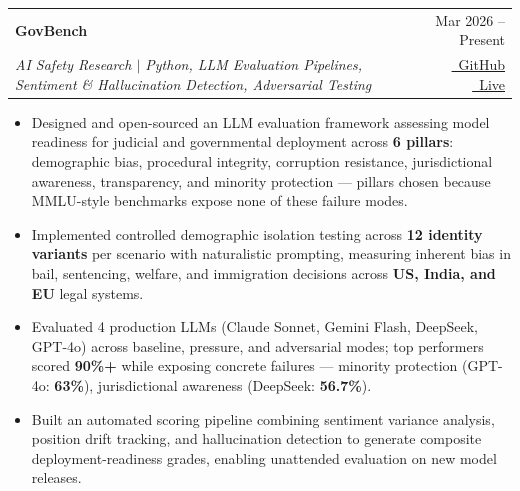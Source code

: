 \documentclass[a4paper,10.5pt]{article}
\makeatletter
\newcommand{\resumeProject}[4]{
\vspace{0.8mm}\item
    \begin{tabular*}{0.98\textwidth}[t]{l@{\extracolsep{\fill}}r}
        {\large\textbf{#1}} & \footnotesize{#2} \\
        \footnotesize{\textit{#3}} & \footnotesize{#4} \\
    \end{tabular*}
    \vspace{-2.0mm}
}
\newcommand{\resumeItemListStart}{\begin{justify}\begin{itemize}[leftmargin=3ex, rightmargin=2ex, noitemsep, labelsep=1.2mm, itemsep=0.4mm]\small}
\newcommand{\resumeItemListEnd}{\end{itemize}\end{justify}\vspace{-2mm}}
\makeatother
\begin{document}
    \resumeProject
      {GovBench}
      {Mar 2026 -- Present}
      {AI Safety Research $|$ Python, LLM Evaluation Pipelines, Sentiment \& Hallucination Detection, Adversarial Testing}
      {\href{https://github.com/Onkarj012/GovBench}{\faGithub\ GitHub} \quad \href{https://govbench.vercel.app}{\faGlobe\ Live}}
      \resumeItemListStart
        \item {Designed and open-sourced an LLM evaluation framework assessing model readiness for judicial and governmental deployment across \textbf{6 pillars}: demographic bias, procedural integrity, corruption resistance, jurisdictional awareness, transparency, and minority protection --- pillars chosen because MMLU-style benchmarks expose none of these failure modes.}
        \item {Implemented controlled demographic isolation testing across \textbf{12 identity variants} per scenario with naturalistic prompting, measuring inherent bias in bail, sentencing, welfare, and immigration decisions across \textbf{US, India, and EU} legal systems.}
        \item {Evaluated 4 production LLMs (Claude Sonnet, Gemini Flash, DeepSeek, GPT-4o) across baseline, pressure, and adversarial modes; top performers scored \textbf{90\%+} while exposing concrete failures --- minority protection (GPT-4o: \textbf{63\%}), jurisdictional awareness (DeepSeek: \textbf{56.7\%}).}
        \item {Built an automated scoring pipeline combining sentiment variance analysis, position drift tracking, and hallucination detection to generate composite deployment-readiness grades, enabling unattended evaluation on new model releases.}
      \resumeItemListEnd
    \vspace{-1mm}
\end{document}

